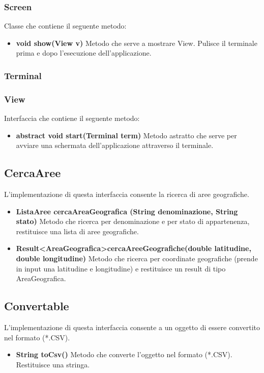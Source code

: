 \documentclass[a4paper, 12pt]{report}
\begin{document}
				\subsubsection{Screen}
				Classe che contiene il seguente metodo:
				\begin{itemize}
				\item \textbf{void show(View v)}
				Metodo che serve a mostrare View. Pulisce il terminale prima e dopo l'esecuzione dell'applicazione.
				\end{itemize}
				
				\subsubsection{Terminal}
				\subsubsection{View}
				Interfaccia che contiene il seguente metodo:
				\begin{itemize}
				\item \textbf{abstract void start(Terminal term)}
				Metodo astratto che serve per avviare una schermata dell'applicazione attraverso il terminale.
				\end{itemize}

			\subsection{CercaAree}
			L'implementazione di questa interfaccia consente la ricerca di aree geografiche.
			\begin{itemize}
				\item \textbf{ListaAree cercaAreaGeografica (String denominazione, String stato)}
				Metodo che ricerca per denominazione e per stato di appartenenza, restituisce una lista di aree geografiche.
				\item\textbf{Result\textless AreaGeografica\textgreater cercaAreeGeografiche(double latitudine, double longitudine)}
				Metodo che ricerca per coordinate geografiche (prende in input una latitudine e longitudine) e restituisce un result di tipo AreaGeografica.
			\end{itemize}

			\subsection{Convertable}
			L'implementazione di questa interfaccia consente a un oggetto di essere convertito nel formato (*.CSV).
			\begin{itemize}
				\item \textbf{String toCsv()}
				Metodo che converte l'oggetto nel formato (*.CSV). Restituisce una stringa.
			\end{itemize}
\end{document}
